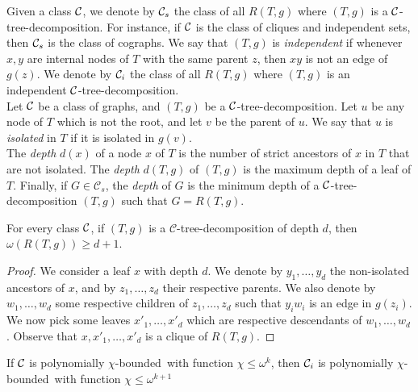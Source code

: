 \documentclass[11pt]{article}
\numberwithin{equation}{section}
\newcommand{\pcb}{polynomially $\chi$-bounded}
\begin{document}
Given a class $\cal C$, we denote by ${\cal C}_s$ the class of all $R(T,g)$ where $(T,g)$ is a $\cal C$-tree-decomposition. For instance, if $\cal C$ is the class of cliques and independent sets, then  ${\cal C}_s$ is the class of cographs.
We say that $(T,g)$ is \emph{independent} if whenever $x, y$ are internal nodes of $T$ with the same parent $z$, then $xy$ is not an edge of $g(z)$. We denote by ${\cal C}_i$ the class of all $R(T,g)$ where $(T,g)$ is an independent $\cal C$-tree-decomposition. \\
Let $\cal C$ be a class of graphs, and $(T, g)$ be a $\cal C$-tree-decomposition. 
Let $u$ be any node of $T$ which is not the root, and let $v$ be the parent of $u$. We say that $u$ is \emph{isolated} in $T$ if it is isolated in $g(v)$. \\
The \emph{depth} $d(x)$ of a node $x$ of $T$ is the number of strict ancestors of $x$ in $T$ that are not isolated.
The \emph{depth} $d(T, g)$ of $(T, g)$ is the maximum depth of a leaf of $T$. 
Finally, if $G \in \mathcal{C}_s$, the \emph{depth} of $G$ is the minimum depth of a $\cal C$-tree-decomposition $(T, g)$ such that $G = R(T, g)$.

\begin{lemma}\label{lem:depth}
For every class $\cal C$, if $(T, g)$ is a $\mathcal{C}$-tree-decomposition of depth $d$, then $\omega(R(T, g)) \geq d + 1$.
\end{lemma}

\begin{proof} We consider a leaf $x$ with depth $d$. We denote by $y_1,\dots, y_d$ the non-isolated ancestors of $x$, and by $z_1,\dots, z_d$ their respective parents. We also denote by $w_1,\dots, w_d$ some respective children of $z_1,\dots, z_d$ such that $y_iw_i$ is an edge in $g(z_i)$. We now pick some leaves $x'_1,\dots ,x'_d$ which are respective descendants of $w_1,\dots, w_d$. Observe that $x,x'_1,\dots ,x'_d$ is a clique of $R(T, g)$.
\end{proof}

\begin{theorem}\label{th:inddec}
If $\cal C$ is \pcb~with function $\chi \leq \omega^k$, then ${\cal C}_i$ is \pcb~with function $\chi \leq \omega^{k+1}$
\end{theorem}
\end{document}
